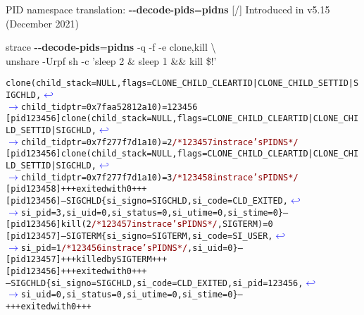 \documentclass[unicode,aspectratio=169,xcolor={table,dvipsnames,usernames}]{beamer}
\newcommand{\symlinebreak}{\textcolor{blue}{\(\hookleftarrow\)}}
\newcommand{\symlinecont}{\textcolor{blue}{\(\longrightarrow\)}}
\begin{document}
\begin{frame}[fragile]{PID namespace translation: \textbf{-{}-decode-pids}=\textbf{pidns} \hfill [\insertframenumber/\inserttotalframenumber]}
Introduced in v5.15 (December 2021)
\begin{block}{strace \textbf{-{}-decode-pids}=\textbf{pidns} -q -f -e clone,kill \textbackslash \\ unshare -Urpf sh -c 'sleep 2 \& sleep 1 \&\& kill \$!'}
\scriptsize
\begin{alltt}
clone(child_stack=NULL, flags=CLONE_CHILD_CLEARTID|CLONE_CHILD_SETTID|SIGCHLD, \symlinebreak
\symlinecont child_tidptr=0x7faa52812a10) = 123456
[pid 123456] clone(child_stack=NULL, flags=CLONE_CHILD_CLEARTID|CLONE_CHILD_SETTID|SIGCHLD, \symlinebreak
\symlinecont child_tidptr=0x7f277f7d1a10) = 2 \textcolor{darkred}{/* 123457 in strace's PID NS */}
[pid 123456] clone(child_stack=NULL, flags=CLONE_CHILD_CLEARTID|CLONE_CHILD_SETTID|SIGCHLD, \symlinebreak
\symlinecont child_tidptr=0x7f277f7d1a10) = 3 \textcolor{darkred}{/* 123458 in strace's PID NS */}
[pid 123458] +++ exited with 0 +++
[pid 123456] --- SIGCHLD \{si_signo=SIGCHLD, si_code=CLD_EXITED, \symlinebreak
\symlinecont si_pid=3, si_uid=0, si_status=0, si_utime=0, si_stime=0\} ---
[pid 123456] kill(2 \textcolor{darkred}{/* 123457 in strace's PID NS */}, SIGTERM) = 0
[pid 123457] --- SIGTERM \{si_signo=SIGTERM, si_code=SI_USER, \symlinebreak
\symlinecont si_pid=1 \textcolor{darkred}{/* 123456 in strace's PID NS */}, si_uid=0\} ---
[pid 123457] +++ killed by SIGTERM +++
[pid 123456] +++ exited with 0 +++
--- SIGCHLD \{si_signo=SIGCHLD, si_code=CLD_EXITED, si_pid=123456, \symlinebreak
\symlinecont si_uid=0, si_status=0, si_utime=0, si_stime=0\} ---
+++ exited with 0 +++
\end{alltt}
\end{block}
\end{frame}
\end{document}
